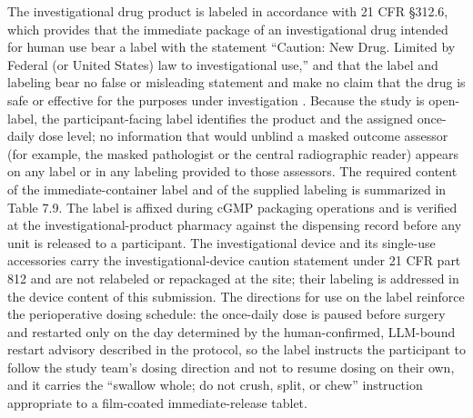 The investigational drug product is labeled in accordance with 21 CFR \S 312.6,
which provides that the immediate package of an investigational drug intended for
human use bear a label with the statement ``Caution: New Drug. Limited by Federal
(or United States) law to investigational use,'' and that the label and labeling
bear no false or misleading statement and make no claim that the drug is safe or
effective for the purposes under investigation \cite{phase1guidance}. Because the
study is open-label, the participant-facing label identifies the product and the
assigned once-daily dose level; no information that would unblind a masked outcome
assessor (for example, the masked pathologist or the central radiographic reader)
appears on any label or in any labeling provided to those assessors. The required
content of the immediate-container label and of the supplied labeling is
summarized in Table 7.9. The label is affixed during cGMP packaging operations and
is verified at the investigational-product pharmacy against the dispensing record
before any unit is released to a participant. The investigational device and its
single-use accessories carry the investigational-device caution statement under
21 CFR part 812 and are not relabeled or repackaged at the site; their labeling is
addressed in the device content of this submission. The directions for use on the
label reinforce the perioperative dosing schedule: the once-daily dose is paused
before surgery and restarted only on the day determined by the human-confirmed,
LLM-bound restart advisory described in the protocol, so the label instructs the
participant to follow the study team's dosing direction and not to resume dosing
on their own, and it carries the ``swallow whole; do not crush, split, or chew''
instruction appropriate to a film-coated immediate-release tablet.

